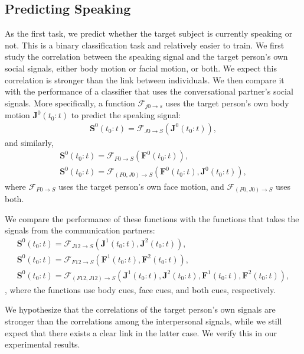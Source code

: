 \subsection{Predicting Speaking}
\label{subsection:ssp_pred_speak}
As the first task, we predict whether the target subject is currently speaking or not. This is a binary classification task and relatively easier to train. We first study the correlation between the speaking signal and the target person's own social signals, either body motion or facial motion, or both. We expect this correlation is stronger than the link between individuals. We then compare it with the performance of a classifier that uses the conversational partner's social signals. More specifically, a function $\mathcal{F}_{j0\rightarrow s}$ uses the target person's own body motion $\mathbf{J}^0(t_0:t)$ to predict the speaking signal:
\begin{gather}	
\mathbf{S}^0(t_0:t) = \mathcal{F}_{J0\rightarrow S} \left( \mathbf{J}^0(t_0:t) \right),
\label{eq:speaking_0}
\end{gather}
and similarly,
\begin{gather}	
\mathbf{S}^0(t_0:t) = \mathcal{F}_{F0\rightarrow S} \left( \mathbf{F}^0(t_0:t) \right),\\
\mathbf{S}^0(t_0:t) = \mathcal{F}_{(F0, J0)\rightarrow S} \left( \mathbf{F}^0(t_0:t) , \mathbf{J}^0(t_0:t)\right),
\label{eq:speaking_0_facebody}
\end{gather}
where $\mathcal{F}_{F0\rightarrow S}$ uses the target person's own face motion, and $\mathcal{F}_{(F0, J0)\rightarrow S}$ uses both. 

We compare the performance of these functions with the functions that takes the signals from the communication partners:
\begin{gather}	
\mathbf{S}^0(t_0:t) = \mathcal{F}_{J12\rightarrow S} \left( \mathbf{J}^1(t_0:t), \mathbf{J}^2(t_0:t) \right),\\
\mathbf{S}^0(t_0:t) = \mathcal{F}_{F12\rightarrow S} \left( \mathbf{F}^1(t_0:t), \mathbf{F}^2(t_0:t) \right),\\
\mathbf{S}^0(t_0:t) = \mathcal{F}_{(F12, J12)\rightarrow S} \left( \mathbf{J}^1(t_0:t), \mathbf{J}^2(t_0:t), \mathbf{F}^1(t_0:t), \mathbf{F}^2(t_0:t) \right),
\label{eq:speaking_1}
\end{gather},
where the functions use body cues, face cues, and both cues, respectively. 

We hypothesize that the correlations of the target person's own signals are stronger than the correlations among the interpersonal signals, while we still expect that there exists a clear link in the latter case. We verify this in our experimental results.

